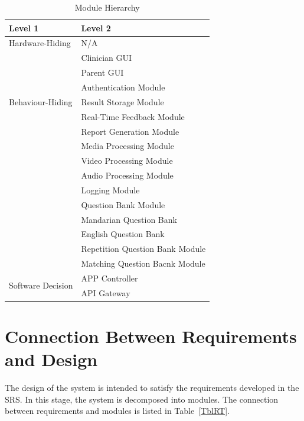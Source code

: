 \documentclass[12pt, titlepage]{article}
\begin{document}
\begin{table}[h!]
  \centering
  \begin{tabular}{p{} p{}}
  \toprule
  \textbf{Level 1} & \textbf{Level 2}\\
  \midrule
  
  {Hardware-Hiding} & N/A \\
  \midrule
  
  \multirow{7}{0.3\textwidth}{Behaviour-Hiding} & Clinician GUI\\
  & Parent GUI\\
  & Authentication Module\\
  & Result Storage Module\\
  & Real-Time Feedback Module\\ 
  & Report Generation Module\\
  & Media Processing Module\\
  & Video Processing Module\\
  & Audio Processing Module\\
  & Logging Module\\
  & Question Bank Module\\
  & Mandarian Question Bank\\
  & English Question Bank\\
  & Repetition Question Bank Module\\
  & Matching Question Bacnk Module\\
  \midrule
  
  \multirow{3}{0.3\textwidth}{Software Decision} & {APP Controller}\\
  & API Gateway\\
  \bottomrule
  
  \end{tabular}
  \caption{Module Hierarchy}
  \label{TblMH}
  \end{table}

\section{Connection Between Requirements and Design} \label{SecConnection}

The design of the system is intended to satisfy the requirements developed in
the SRS. In this stage, the system is decomposed into modules. The connection
between requirements and modules is listed in Table~\ref{TblRT}.

\end{document}
